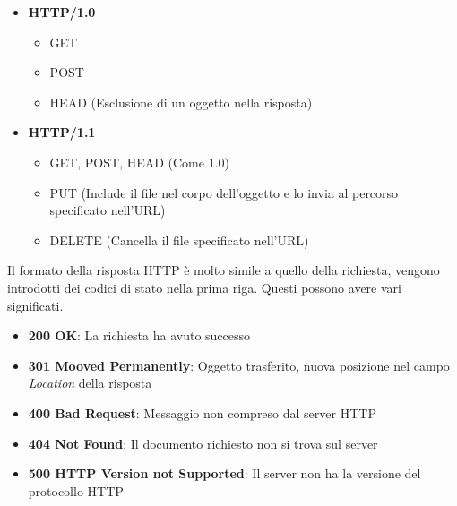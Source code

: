 \documentclass{article}
\newcounter{subsubsubsection}[subsubsection]
\begin{document}
                \begin{itemize}
                    \item \textbf{HTTP/1.0}
                          \begin{itemize}
                              \item GET
                              \item POST
                              \item HEAD (Esclusione di un oggetto nella  risposta)
                          \end{itemize}
                    \item \textbf{HTTP/1.1}
                          \begin{itemize}
                              \item GET, POST, HEAD (Come 1.0)
                              \item PUT (Include il file nel corpo dell'oggetto e lo invia al percorso specificato nell'URL)
                              \item DELETE (Cancella il file specificato nell'URL)
                          \end{itemize}
                \end{itemize}

                    Il formato della risposta HTTP è molto simile a quello della richiesta, vengono introdotti dei codici di stato nella prima riga. Questi possono avere vari significati.
                    \begin{itemize}
                        \item \textbf{200 OK}: La richiesta ha avuto successo
                        \item \textbf{301 Mooved Permanently}: Oggetto trasferito, nuova posizione nel campo \textit{Location} della risposta
                        \item \textbf{400 Bad Request}: Messaggio non compreso dal server HTTP
                        \item \textbf{404 Not Found}: Il documento richiesto non si trova sul server
                        \item \textbf{500 HTTP Version not Supported}: Il server non ha la versione del protocollo HTTP
                    \end{itemize}
\end{document}
